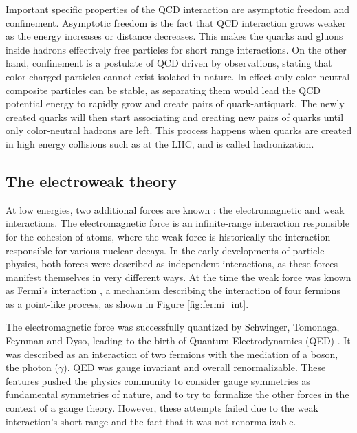 Important specific properties of the QCD interaction are asymptotic freedom and confinement. Asymptotic freedom is the fact that QCD interaction grows weaker as the energy increases or distance decreases. This makes the quarks and gluons inside hadrons effectively free particles for short range interactions. On the other hand, confinement is a postulate of QCD driven by observations, stating that color-charged particles cannot exist isolated in nature. In effect only color-neutral composite particles can be stable, as separating them would lead the QCD potential energy to rapidly grow and create pairs of quark-antiquark. The newly created quarks will then start associating and creating new pairs of quarks until only color-neutral hadrons are left. This process happens when quarks are created in high energy collisions such as at the LHC, and is called hadronization.

\subsection{The electroweak theory}
\label{sec:EWtheory}
At low energies, two additional forces are known : the electromagnetic and weak interactions. The electromagnetic force is an infinite-range interaction responsible for the cohesion of atoms, where the weak force is historically the interaction responsible for various nuclear decays. In the early developments of particle physics, both forces were described as independent interactions, as these forces manifest themselves in very different ways. At the time the weak force was known as Fermi's interaction \cite{Fermi2008}, a mechanism describing the interaction of four fermions as a point-like process, as shown in Figure \ref{fig:fermi_int}.

The electromagnetic force was successfully quantized by Schwinger, Tomonaga, Feynman and Dyso, leading to the birth of Quantum Electrodynamics (QED) \cite{PhysRev.80.440,PhysRev.76.749,PhysRev.76.769,PhysRev.74.1439,PhysRev.73.416,10.1143/PTP.1.27} . It was described as an interaction of two fermions with the mediation of a boson, the photon ($\gamma$). QED was gauge invariant and overall renormalizable. These features pushed the physics community to consider gauge symmetries as fundamental symmetries of nature, and to try to formalize the other forces in the context of a gauge theory. However, these attempts failed due to the weak interaction's short range and the fact that it was not renormalizable.


